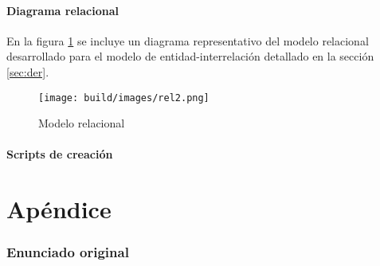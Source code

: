 \documentclass[a4paper,11pt]{article}
\begin{document}
\subsection{Diagrama relacional}

 En la figura \ref{fig:relacional} se incluye un diagrama representativo del
 modelo relacional desarrollado para el modelo de entidad-interrelación
 detallado en la sección \ref{sec:der}.

\begin{figure}[h!t]
	\centering
	\texttt{[image: build/images/rel2.png]}
	\caption{Modelo relacional} \label{fig:relacional}
\end{figure}

\FloatBarrier

\subsection{Scripts de creación}




\clearpage

\part{Apéndice}
\appendix

\section{Enunciado original}\label{sec:enunciado}

\end{document}
